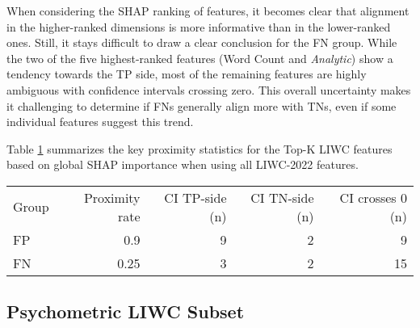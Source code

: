 When considering the SHAP ranking of features, it becomes clear that alignment in the higher-ranked dimensions is more informative than in the lower-ranked ones. Still, it stays difficult to draw a clear conclusion for the FN group. While the two of the five highest-ranked features ({Word Count} and \textit{Analytic}) show a tendency towards the TP side, most of the remaining features are highly ambiguous with confidence intervals crossing zero. This overall uncertainty makes it challenging to determine if FNs generally align more with TNs, even if some individual features suggest this trend.

Table \ref{tab:proximity_key_results_all} summarizes the key proximity statistics for the Top-K LIWC features based on global SHAP importance when using all LIWC-2022 features. 

\begin{table}[H]
\centering
{}
\label{tab:proximity_key_results_all}
\begin{tabular}{@{}lrrrr@{}}
\toprule
Group & Proximity rate & CI TP-side (n) & CI TN-side (n) & CI crosses 0 (n) \\
\cmidrule(lr){2-5}
FP & 0.9 & 9 & 2 & 9 \\
FN & 0.25 & 3 & 2 & 15 \\
\bottomrule
\end{tabular}
\end{table}


\subsection{Psychometric LIWC Subset}



